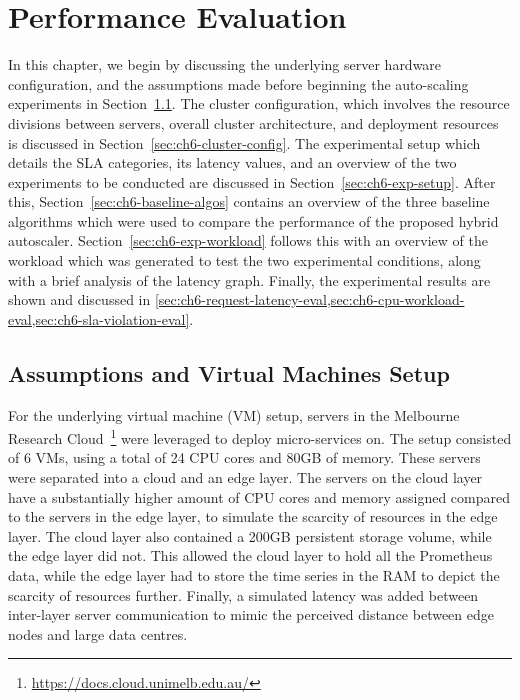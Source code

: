 \clearpage

\def\chaptertitle{Performance Evaluation}

\lhead{\emph{\chaptertitle}}

\chapter{\chaptertitle}
\label{ch:performance-evaluation}

In this chapter, we begin by discussing the underlying server hardware configuration, and the assumptions made before beginning the auto-scaling experiments in Section~\ref{sec:ch6-hardware-assumptions}. The cluster configuration, which involves the resource divisions between servers, overall cluster architecture, and deployment resources is discussed in Section~\ref{sec:ch6-cluster-config}. The experimental setup which details the SLA categories, its latency values, and an overview of the two experiments to be conducted are discussed in Section~\ref{sec:ch6-exp-setup}. After this, Section~\ref{sec:ch6-baseline-algos} contains an overview of the three baseline algorithms which were used to compare the performance of the proposed hybrid autoscaler. Section~\ref{sec:ch6-exp-workload} follows this with an overview of the workload which was generated to test the two experimental conditions, along with a brief analysis of the latency graph. Finally, the experimental results are shown and discussed in \cref{sec:ch6-request-latency-eval,sec:ch6-cpu-workload-eval,sec:ch6-sla-violation-eval}.

\section{Assumptions and Virtual Machines Setup}
\label{sec:ch6-hardware-assumptions}

For the underlying virtual machine (VM) setup, servers in the Melbourne Research Cloud~\footnote{\url{https://docs.cloud.unimelb.edu.au/}} were leveraged to deploy micro-services on. The setup consisted of 6 VMs, using a total of 24 CPU cores and 80GB of memory. These servers were separated into a cloud and an edge layer. The servers on the cloud layer have a substantially higher amount of CPU cores and memory assigned compared to the servers in the edge layer, to simulate the scarcity of resources in the edge layer. The cloud layer also contained a 200GB persistent storage volume, while the edge layer did not. This allowed the cloud layer to hold all the Prometheus data, while the edge layer had to store the time series in the RAM to depict the scarcity of resources further. Finally, a simulated latency was added between inter-layer server communication to mimic the perceived distance between edge nodes and large data centres.\par

